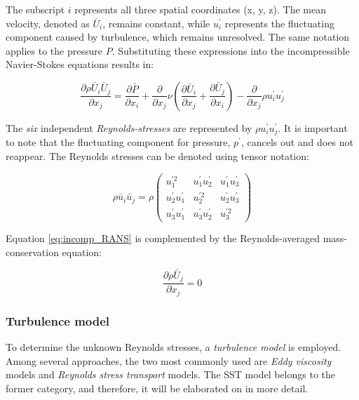 \noindent The subscript $i$ represents all three spatial coordinates (x, y, z).
The mean velocity, denoted as $\bar U_{i}$, remains constant, while
$u_{i}^{\prime}$ represents the fluctuating component caused by turbulence,
which remains unresolved. The same notation applies to the pressure $P$.
Substituting these expressions into the incompressible Navier-Stokes equations
results in:

\begin{equation}
    \label{eq:incomp_RANS}
    \frac{\partial \rho \bar U_{i} \bar U_{j}}{\partial x_{j}} =
    \frac{\partial \bar P}{\partial x_{i}} +
    \frac{\partial}{\partial x_{j}} \nu (\frac{\partial 
    \bar U_{i}}{\partial x_{j}} +
    \frac{\partial \bar U_{j}}{\partial x_{i}}) -
    \frac{\partial}{\partial x_{j}} \rho u_{i}^{\prime} u_{j}^{\prime}
\end{equation}

\noindent The \textit{six} independent \textit{Reynolds-stresses} are
represented by $\rho u_{i}^{\prime} u_{j}^{\prime}$. It is important to note
that the fluctuating component for pressure, $p^{\prime}$, cancels out and does
not reappear. The Reynolds stresses can be denoted using tensor notation:

\begin{equation}
    \rho \bar u_{i} \bar u_{j} = \rho
    \begin{pmatrix}
        u_{1}^{\prime 2}              & u_{1}^{\prime} u_{2}^{\prime} & 
        u_{1}^{\prime} u_{3}^{\prime} \\

        u_{2}^{\prime} u_{1}^{\prime} & u_{2}^{\prime 2}              & 
        u_{2}^{\prime} u_{3}^{\prime} \\

        u_{3}^{\prime} u_{1}^{\prime} & u_{3}^{\prime} u_{2}^{\prime} & 
        u_{3}^{\prime 2}
    \end{pmatrix}
\end{equation}

\noindent Equation \ref{eq:incomp_RANS} is complemented by the Reynolds-averaged
mass-conservation equation:

\begin{equation}
    \frac{\partial \rho \bar U_{j}}{\partial x_{j}} = 0
\end{equation}


\subsubsection{Turbulence model}
To determine the unknown Reynolds stresses, a \textit{turbulence model} is
employed. Among several approaches, the two most commonly used are \textit{Eddy
viscosity} models and \textit{Reynolds stress transport} models. The SST model
belongs to the former category, and therefore, it will be elaborated on in more
detail.


